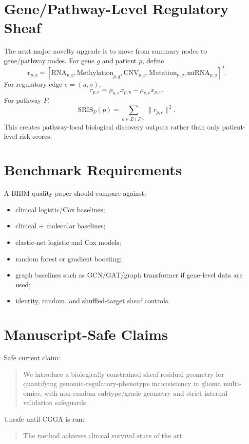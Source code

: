 \documentclass[11pt]{article}
\begin{document}
\section{Gene/Pathway-Level Regulatory Sheaf}
The next major novelty upgrade is to move from summary nodes to gene/pathway nodes. For gene $g$ and patient $p$, define
\begin{equation}
 x_{p,g}=[\mathrm{RNA}_{p,g},\mathrm{Methylation}_{p,g},\mathrm{CNV}_{p,g},\mathrm{Mutation}_{p,g},\mathrm{miRNA}_{p,g}]^T.
\end{equation}
For regulatory edge $e=(u,v)$,
\begin{equation}
 r_{p,e}=\rho_{u,e}x_{p,u}-\rho_{v,e}x_{p,v}.
\end{equation}
For pathway $P$,
\begin{equation}
 \mathrm{SRIS}_{P}(p)=\sum_{e\in E(P)}\|r_{p,e}\|^2.
\end{equation}
This creates pathway-local biological discovery outputs rather than only patient-level risk scores.
\section{Benchmark Requirements}
A BIBM-quality paper should compare against:
\begin{itemize}[leftmargin=*]
\item clinical logistic/Cox baselines;
\item clinical + molecular baselines;
\item elastic-net logistic and Cox models;
\item random forest or gradient boosting;
\item graph baselines such as GCN/GAT/graph transformer if gene-level data are used;
\item identity, random, and shuffled-target sheaf controls.
\end{itemize}
\section{Manuscript-Safe Claims}
Safe current claim:
\begin{quote}
We introduce a biologically constrained sheaf residual geometry for quantifying genomic-regulatory-phenotype inconsistency in glioma multi-omics, with non-random subtype/grade geometry and strict internal validation safeguards.
\end{quote}
Unsafe until CGGA is run:
\begin{quote}
The method achieves clinical survival state of the art.
\end{quote}
\end{document}
